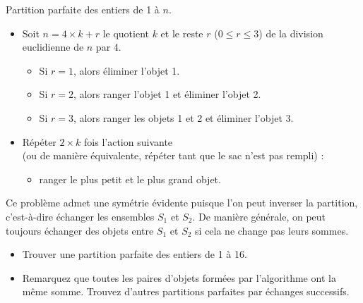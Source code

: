 \documentclass[11pt]{article}
\begin{document}
  \begin{algorithme}{Partition parfaite des entiers de 1 à $n$.}
    \begin{itemize}
    \item Soit $n = 4 \times k + r$ le quotient $k$ et le reste $r$ ($0 \leq r \leq 3$) de la division euclidienne de $n$ par 4.
      \begin{itemize}
      \item Si $r=1$, alors éliminer l'objet 1.
      \item Si $r=2$, alors ranger l'objet 1 et éliminer l'objet 2.
      \item Si $r=3$, alors ranger les objets 1 et 2 et éliminer l'objet 3.
      \end{itemize}
  \item Répéter $2 \times k$ fois l'action suivante \\ (ou de manière équivalente, répéter tant que le sac n'est pas rempli) :
    \begin{itemize}
    \item ranger le plus petit et le plus grand objet.
    \end{itemize}
  \end{itemize}
  \end{algorithme}

\begin{remarque}{}
    Ce problème admet une symétrie évidente puisque l'on peut inverser la partition, c'est-à-dire échanger les ensembles $S_1$ et $S_2$.
    De manière générale, on peut toujours échanger des objets entre $S_1$ et $S_2$ si cela ne change pas leurs sommes.
  \end{remarque}


\begin{exercice}{}
  \begin{itemize}
  \item Trouver une partition parfaite des entiers de 1 à 16.
  \item Remarquez que toutes les paires d'objets formées par l'algorithme ont la même somme.
    Trouvez d'autres partitions parfaites par échanges successifs.
  \end{itemize}

\end{exercice}
\end{document}
